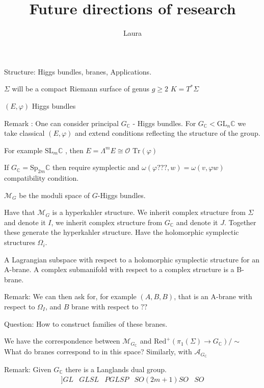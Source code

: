 % 



\title{Future directions of research}
\author{Laura}
\date{}

 
\maketitle

Structure: Higgs bundles, branes, Applications. 

$\Sigma$ will be a compact Riemann surface of genus $g \geq 2$ 
$K = T^* \Sigma$


$(E, \varphi)$ Higgs bundles 


Remark : 
One can consider principal $G_\mathbb{C} $ - Higgs bundles.
For $ G_\mathbb{C} < \mathrm{GL}_n \mathbb{C} $ we take classical $(E, \varphi)$ and extend 
conditions reflecting the structure of the group.

For example $ \mathrm{SL}_m \mathbb{C}  $ , then $E = \Lambda^m E \cong \mathcal{O} $ 
$ \mathrm{Tr} (\varphi) $ 

If $ G_\mathbb{C}  = \mathrm{Sp}_{2m} \mathbb{C}  $ then require symplectic 
and $ \omega ( \varphi ???, w)  = \omega ( v, \varphi w) $ compatibility condition. 

$\mathcal{M} _{G} $ be the moduli space of $ G$-Higgs bundles. 

Have that $ \mathcal{M} _G $ is a hyperkahler structure.
We inherit complex structure from $\Sigma$ and denote it $I$,
we inherit complex structure from $ G_\mathbb{C} $ and denote it $J$. 
Together these generate the hyperkahler structure. 
Have the holomorphic symplectic structures $\Omega _i $. 

A Lagrangian subspace with respect to a holomorphic symplectic structure for an A-brane. 
A complex submanifold with respect to a complex structure is a B-brane.

Remark: We can then ask for, for example $(A, B, B)$, that is an A-brane with respect to  $\Omega_I$, and $B$ brane with respect to  $??$

Question: How to construct families of these branes.

We have the correspondence between $ \mathcal{M} _{G_\mathbb{C}  } $ and $\mathrm{Red} ^+ (\pi_1 (\Sigma) \rightarrow G_\mathbb{C} ) / \sim $ 
What do branes correspond to in this space?
Similarly, with $ \mathcal{A}_{G_\mathbb{C} } $ 

Remark: 
Given $ G_\mathbb{C}  $ there is a Langlands dual group. 
\begin{align}
    [[LIST OF DUAL GROUPS ]]
    GL & GL 
    SL & PGL 
    SP & SO (2m+1 ) 
    SO & SO 
\end{align}

